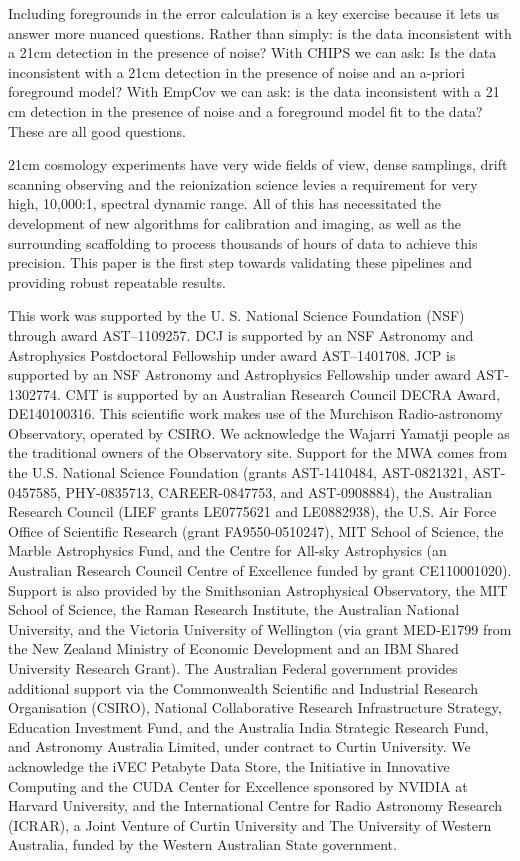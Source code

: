 \documentclass[twolcolumn]{emulateapj}
\def\empirical{EmpCov}
\begin{document}
Including foregrounds in the error calculation is a key exercise because it lets us answer more nuanced questions. Rather than simply: is the data inconsistent with a 21cm detection in the presence of noise? With CHIPS we can ask: Is the data inconsistent with a 21cm detection in the presence of noise and an a-priori foreground model? With \empirical{} we can ask: is the data inconsistent with a 21 cm detection in the presence of noise and a foreground model fit to the data? These are all good questions.

21cm cosmology experiments have very wide fields of view, dense samplings, drift scanning observing and the reionization science levies a requirement for very high, 10,000:1, spectral dynamic range. All of this has necessitated the development of new algorithms for calibration and imaging, as well as the surrounding scaffolding to process thousands of hours of data to achieve this precision.  This paper is the first step towards validating these pipelines and providing robust repeatable results.





\acknowledgments

This work was supported	 by the U. S. National Science Foundation (NSF) through award AST--1109257. DCJ is supported by an NSF Astronomy and Astrophysics Postdoctoral Fellowship under award AST--1401708. JCP is supported by an NSF Astronomy and Astrophysics Fellowship under award AST-1302774. CMT is supported by an Australian Research Council DECRA Award, DE140100316. This scientific work makes use of the Murchison Radio-astronomy Observatory, operated by CSIRO. We acknowledge the Wajarri Yamatji people as the traditional owners of the Observatory site. Support for the MWA comes from the U.S. National Science Foundation (grants  AST-1410484, AST-0821321, AST-0457585, PHY-0835713, CAREER-0847753, and AST-0908884), the Australian Research Council (LIEF grants LE0775621 and LE0882938), the U.S. Air Force Office of Scientific Research (grant FA9550-0510247), MIT School of Science, the Marble Astrophysics Fund, and the Centre for All-sky Astrophysics (an Australian Research Council Centre of Excellence funded by grant CE110001020). Support is also provided by the Smithsonian Astrophysical Observatory, the MIT School of Science, the Raman Research Institute, the Australian National University, and the Victoria University of Wellington (via grant MED-E1799 from the New Zealand Ministry of Economic Development and an IBM Shared University Research Grant). The Australian Federal government provides additional support via the Commonwealth Scientific and Industrial Research Organisation (CSIRO), National Collaborative Research Infrastructure Strategy, Education Investment Fund, and the Australia India Strategic Research Fund, and Astronomy Australia Limited, under contract to Curtin University. We acknowledge the iVEC Petabyte Data Store, the Initiative in Innovative Computing and the CUDA Center for Excellence sponsored by NVIDIA at Harvard University, and the International Centre for Radio Astronomy Research (ICRAR), a Joint Venture of Curtin University and The University of Western Australia, funded by the Western Australian State government.
\end{document}
